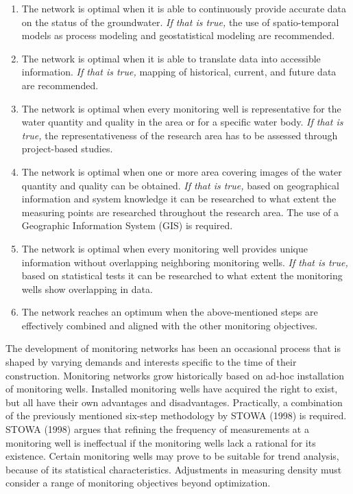 \begin{enumerate}
    \item The network is optimal when it is able to continuously provide accurate data on the status of the groundwater. 
\textit{If that is true,} the use of spatio-temporal models as process modeling and geostatistical modeling are recommended. \textbf{
}    \item The network is optimal when it is able to translate data into accessible information.
\textit{If that is true,} mapping of historical, current, and future data are recommended.
    \item The network is optimal when every monitoring well is representative for the water quantity and quality in the area or for a specific water body. 
\textit{If that is true,} the representativeness of the research area has to be assessed through project-based studies.\textbf{
}    \item The network is optimal when one or more area covering images of the water quantity and quality can be obtained. 
\textit{If that is true,} based on geographical information and system knowledge it can be researched to what extent the measuring points are researched throughout the research area. The use of a Geographic Information System (GIS) is required. \textbf{
}    \item The network is optimal when every monitoring well provides unique information without overlapping neighboring monitoring wells. 
\textit{If that is true,} based on statistical tests it can be researched to what extent the monitoring wells show overlapping in data. 
\item The network reaches an optimum when the above-mentioned steps are effectively combined and aligned with the other monitoring objectives.
\\

\end{enumerate}
The development of monitoring networks has been an occasional process that is shaped by varying demands and interests specific to the time of their construction. Monitoring networks grow historically based on ad-hoc installation of monitoring wells. Installed monitoring wells have acquired the right to exist, but all have their own advantages and disadvantages. Practically, a combination of the previously mentioned six-step methodology by STOWA (1998) is required. STOWA (1998) argues that refining the frequency of measurements at a monitoring well is ineffectual if the monitoring wells lack a rational for its existence. Certain monitoring wells may prove to be suitable for trend analysis, because of its statistical characteristics. Adjustments in measuring density must consider a range of monitoring objectives beyond optimization.\\
